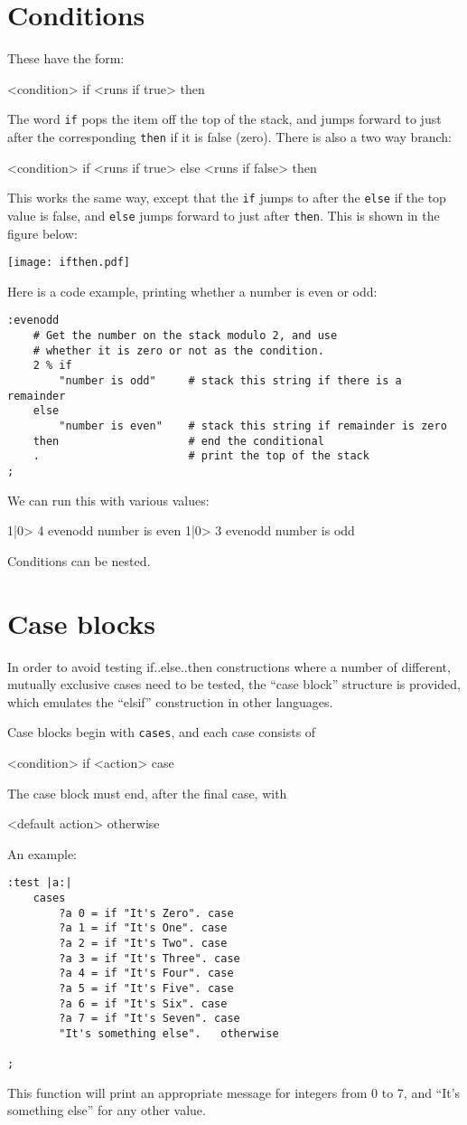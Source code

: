 \section{Conditions}
These have the form:
\begin{v}
<condition> if <runs if true> then
\end{v}
The word \texttt{if} pops the item off the top of the stack,
and jumps forward to just after the corresponding \texttt{then} if it is false (zero).
There is also a two way branch:
\begin{v}
<condition> if <runs if true> else <runs if false> then
\end{v}
This works the same way, except that the \texttt{if} jumps to after the
\texttt{else} if the top value is false, and \texttt{else} jumps forward
to just after \texttt{then}. This is shown in the figure below:
\begin{center}
\texttt{[image: ifthen.pdf]}
\end{center}
Here is a code example, printing whether a number is even or odd:
\begin{lstlisting}
:evenodd 
    # Get the number on the stack modulo 2, and use
    # whether it is zero or not as the condition.
    2 % if
        "number is odd"     # stack this string if there is a remainder
    else
        "number is even"    # stack this string if remainder is zero
    then                    # end the conditional
    .                       # print the top of the stack
;
\end{lstlisting}
We can run this with various values:
\begin{v}
1|0> 4 evenodd
number is even
1|0> 3 evenodd
number is odd
\end{v}
Conditions can be nested.
\section{Case blocks}
In order to avoid testing if..else..then constructions where a number of
different, mutually exclusive cases need to be tested, the ``case block''
structure is provided, which emulates the ``elsif'' construction in other
languages.

Case blocks begin with \texttt{cases}, and each case consists
of 
\begin{v}
    <condition> if <action> case
\end{v}
The case block must end, after the final case, with
\begin{v}
    <default action> otherwise
\end{v}
An example:
\begin{lstlisting}
:test |a:|
    cases
        ?a 0 = if "It's Zero". case
        ?a 1 = if "It's One". case
        ?a 2 = if "It's Two". case
        ?a 3 = if "It's Three". case
        ?a 4 = if "It's Four". case
        ?a 5 = if "It's Five". case
        ?a 6 = if "It's Six". case
        ?a 7 = if "It's Seven". case
        "It's something else".   otherwise
    
;
\end{lstlisting}
This function will print an appropriate message for integers from 0 to 7,
and ``It's something else'' for any other value.

